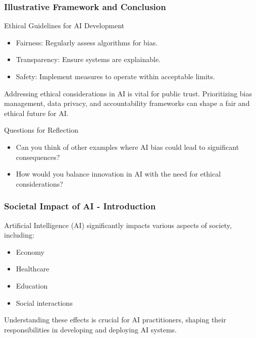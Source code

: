 \documentclass{beamer}
\begin{document}
\begin{frame}[fragile]
    \frametitle{Illustrative Framework and Conclusion}

    \begin{block}{Ethical Guidelines for AI Development}
        \begin{itemize}
            \item Fairness: Regularly assess algorithms for bias.
            \item Transparency: Ensure systems are explainable.
            \item Safety: Implement measures to operate within acceptable limits.
        \end{itemize}
    \end{block}
    
    Addressing ethical considerations in AI is vital for public trust. Prioritizing bias management, data privacy, and accountability frameworks can shape a fair and ethical future for AI.

    \begin{block}{Questions for Reflection}
        \begin{itemize}
            \item Can you think of other examples where AI bias could lead to significant consequences?
            \item How would you balance innovation in AI with the need for ethical considerations?
        \end{itemize}
    \end{block}

\end{frame}

\begin{frame}[fragile]
    \frametitle{Societal Impact of AI - Introduction}
    Artificial Intelligence (AI) significantly impacts various aspects of society, including:
    \begin{itemize}
        \item Economy
        \item Healthcare
        \item Education
        \item Social interactions
    \end{itemize}
    Understanding these effects is crucial for AI practitioners, shaping their responsibilities in developing and deploying AI systems.
\end{frame}
\end{document}
